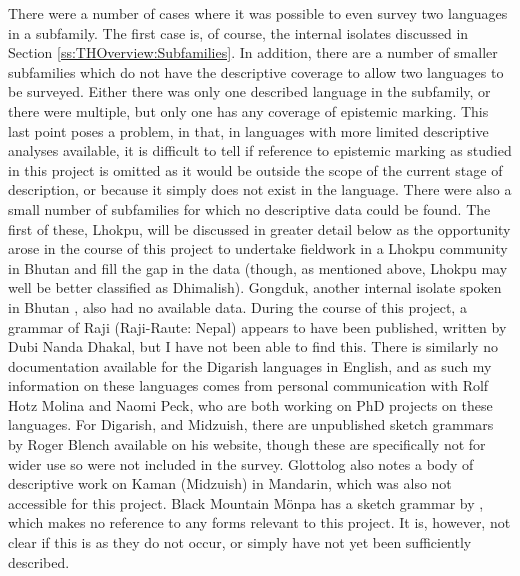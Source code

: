 There were a number of cases where it was possible to even survey two languages in a subfamily. The first case is, of course, the internal isolates discussed in Section \ref{ss:THOverview:Subfamilies}. In addition, there are a number of smaller subfamilies which do not have the descriptive coverage to allow two languages to be surveyed. Either there was only one described language in the subfamily, or there were multiple, but only one has any coverage of epistemic marking. This last point poses a problem, in that, in languages with more limited descriptive analyses available, it is difficult to tell if reference to epistemic marking as studied in this project is omitted as it would be outside the scope of the current stage of description, or because it simply does not exist in the language. There were also a small number of subfamilies for which no descriptive data could be found. The first of these, Lhokpu, will be discussed in greater detail below as the opportunity arose in the course of this project to undertake fieldwork in a Lhokpu community in Bhutan and fill the gap in the data (though, as mentioned above, Lhokpu may well be better classified as Dhimalish). Gongduk, another internal isolate spoken in Bhutan \cite{VanDriem2001b}, also had no available data. During the course of this project, a grammar of Raji (Raji-Raute: Nepal) appears to have been published, written by Dubi Nanda Dhakal, but I have not been able to find this. There is similarly no documentation available for the Digarish languages in English, and as such my information on these languages comes from personal communication with Rolf Hotz Molina and Naomi Peck, who are both working on PhD projects on these languages. For Digarish, and Midzuish, there are unpublished sketch grammars by Roger Blench available on his website, though these are specifically not for wider use so were not included in the survey. Glottolog also notes a body of descriptive work on Kaman (Midzuish) in Mandarin, which was also not accessible for this project. Black Mountain Mönpa has a sketch grammar by , which makes no reference to any forms relevant to this project. It is, however, not clear if this is as they do not occur, or simply have not yet been sufficiently described.

